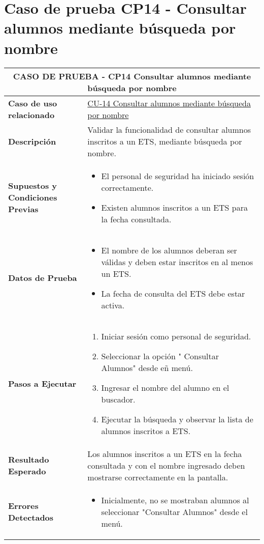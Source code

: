 \section{Caso de prueba CP14 - Consultar alumnos mediante búsqueda por nombre}

\begin{longtable}{|p{5cm}|p{10cm}|}
	\hline
	\multicolumn{2}{|c|}{\textbf{CASO DE PRUEBA - CP14 Consultar alumnos mediante búsqueda por nombre}} \\
	\hline
	\textbf{Caso de uso relacionado} & \hyperref[CU-14]{CU-14 Consultar alumnos mediante búsqueda por nombre} \\
	\hline
	\textbf{Descripción} & Validar la funcionalidad de consultar alumnos inscritos a un ETS, mediante búsqueda por nombre. \\
	\hline
	\textbf{Supuestos y Condiciones Previas} & 
	\begin{itemize}
		\item El personal de seguridad ha iniciado sesión correctamente.
		\item Existen alumnos inscritos a un ETS para la fecha consultada.
	\end{itemize} \\
	\hline
	\textbf{Datos de Prueba} & 
	\begin{itemize}
		\item El nombre de los alumnos deberan ser válidas y deben estar inscritos en al menos un ETS.
		\item La fecha de consulta del ETS debe estar activa.
	\end{itemize} \\
	\hline
	\textbf{Pasos a Ejecutar} & 
	\begin{enumerate}
		\item Iniciar sesión como personal de seguridad.
		\item Seleccionar la opción " Consultar Alumnos" desde eñ menú.
		\item Ingresar el nombre del alumno en el buscador.
		\item Ejecutar la búsqueda y observar la lista de alumnos inscritos a ETS.
	\end{enumerate} \\
	\hline
	\textbf{Resultado Esperado} & 
	Los alumnos inscritos a un ETS en la fecha consultada y con el nombre ingresado deben mostrarse correctamente en la pantalla. \\
	\hline
	\textbf{Errores Detectados} &
	\begin{itemize}
		\item Inicialmente, no se mostraban alumnos al seleccionar "Consultar Alumnos" desde el menú.

\end{itemize}
\end{longtable}
